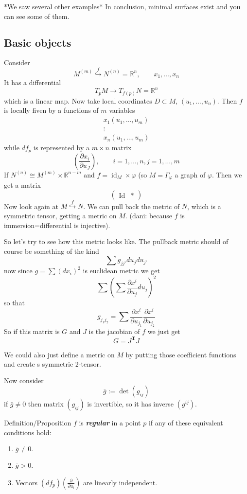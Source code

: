 *We saw several other examples* In conclusion, minimal surfaces exist and you can see some of them.

\subsection{Basic objects}

Consider
\[M^{(m)}\overset{f}{\hookrightarrow }N^{(n)}=\mathbb{R}^n,\qquad x_1,\ldots,x_n\]
It has a differential
\[T_pM \longrightarrow T_{f(p)}N=\mathbb{R}^n\]
which is a linear map. Now take local coordinates \(D \subset M\), \((u_1,\ldots,u_n)\). Then \(f \) is locally fiven by a functions of \(m\) variables
\begin{align*}
	x_1(u_1,\ldots,u_m)\\
	\vdots \\
	x_n(u_1,\ldots,u_m)
\end{align*}
while \(df_p\) is represented by a \(m\times n\) matrix
\[\left(\frac{\partial x_i}{\partial u_J}\right) ,\qquad  i=1,\ldots,n, j=1,\ldots,m\]
If \(N^{(n)}\cong M^{(m)}\times \mathbb{R}^{n-m}\) and \(f= \operatorname{id}_M \times \varphi\) (so \(M = \Gamma_\varphi\) a graph of \(\varphi\). Then we get a matrix
\[\begin{pmatrix} \operatorname{Id} & * \end{pmatrix} \]
Now look again at \(M \overset{f}{\hookrightarrow }N\). We can pull back the metric of \(N\), which is a symmetric tensor, getting a metric on \(M\). ({\color{6}dani: because \(f\) is immersion=differential is injective).}

So let's try to see how this metric looks like. The pullback metric should of course be something of the kind
\[\sum g_{j j'} du_j du_{j'}\]
now since \(g= \sum (dx_i)^2\) is euclidean metric we get
\[\sum \left(\sum \frac{\partial x^i}{\partial u_j}du_j\right)^2 \]
so that
\[g_{j_1j_2}= \sum \frac{\partial x^i}{\partial u_{j_1}}\frac{\partial x^i}{\partial u_{j_2}}\]
So if this matrix is \(G\) and \(J\) is the jacobian of \(f\) we just get
\[G=J^{\mathbf{T}}J\]

\begin{remark}\leavevmode
We could also just define a metric on \(M\) by putting those coefficient functions and create s symmetric 2-tensor.
\end{remark}
Now consider
\[\bar{g} :=\det(g_{ij})\]
if \(\bar{g}\neq 0 \) then matrix  \((g_{ij})\) is invertible, so it has inverse \((g^{ij})\).

\begin{thing8}{Definition/Proposition}\leavevmode
\(f\) is \textit{\textbf{regular}} in a point \(p\) if any of these equivalent conditions hold:
\begin{enumerate}
\item \(\bar{g}\neq 0\).
\item \(\bar{g}>0\).
\item Vectors \(\left(df_p\right) \left(\frac{\partial }{\partial u_i}\right) \) are linearly independent.
\end{enumerate}
\end{thing8}

